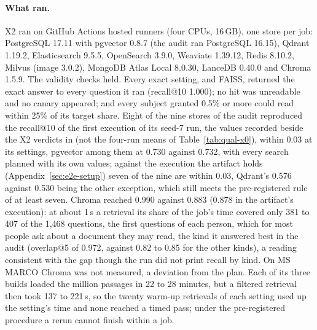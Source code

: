 \paragraph{What ran.}
X2 ran on GitHub Actions hosted runners (four CPUs, 16\,GB), one store per job: PostgreSQL 17.11
with pgvector 0.8.7 (the audit ran PostgreSQL 16.15), Qdrant 1.19.2, Elasticsearch 9.5.5, OpenSearch 3.9.0, Weaviate 1.39.12, Redis
8.10.2, Milvus (image 3.0.2), MongoDB Atlas Local 8.0.30, LanceDB 0.40.0 and Chroma 1.5.9. The
validity checks held. Every exact setting, and FAISS, returned the exact answer to every question it
ran (recall@10 1.000); no hit was unreadable and no canary appeared; and every subject granted 0.5\%
or more could read within 25\% of its target share. Eight of the nine stores of the audit reproduced
the recall@10 of the first execution of its seed-7 run, the values recorded beside the X2 verdicts in 
(not the four-run means of Table~\ref{tab:qual-x0}), within 0.03 at its
settings, pgvector among
them at 0.730 against 0.732, with every search planned with its own values; against the execution the artifact holds
(Appendix~\ref{sec:e2e-setup}) seven of the nine are within 0.03, Qdrant's 0.576 against 0.530 being the other exception, which
still meets the pre-registered rule of at least seven. Chroma reached 0.990
against 0.883 (0.878 in the artifact's execution): at about 1\,s a retrieval its share of the job's time covered only 381 to 407 of the
1,468 questions, the first questions of each person, which for most people ask about a document they
may read, the kind it answered best in the audit (overlap@5 of 0.972, against 0.82 to 0.85 for the
other kinds), a reading consistent with the gap though the run did not print recall by kind. On
MS MARCO Chroma was not measured, a deviation from the plan. Each of its three builds loaded the million
passages in 22 to 28 minutes, but a filtered retrieval then took 137 to 221\,s, so the twenty
warm-up retrievals of each setting used up the setting's time and none reached a timed pass; under
the pre-registered procedure a rerun cannot finish within a job.

